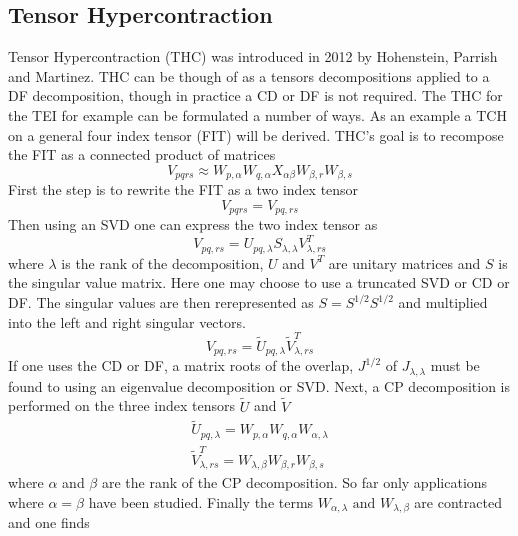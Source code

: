 	\subsection{Tensor Hypercontraction}
		Tensor Hypercontraction (THC) was introduced in 2012 by Hohenstein, Parrish and Martinez\cite{Schutski2017}. THC can be though of as a tensors decompositions applied to a DF decomposition, though in practice a CD or DF is not required. The THC for the TEI for example can be formulated a number of ways. As an example a TCH on a general four index tensor (FIT) will be derived. THC's goal is to recompose the FIT as a connected product of matrices 
			\begin{equation}
				V_{pqrs} \approx W_{p,\alpha} W_{q,\alpha} X_{\alpha\beta} W_{\beta, r} W_{\beta,s}
			\end{equation}
		First the step is to rewrite the FIT as a two index tensor
			\begin{equation}
				V_{pqrs} = V_{pq,rs}
			\end{equation}
		Then using an SVD one can express the two index tensor as
			\begin{equation}
				V_{pq,rs} = U_{pq,\lambda}S_{\lambda,\lambda} V^T_{\lambda, rs}
			\end{equation}
		where $\lambda$ is the rank of the decomposition, $U$ and $V^T$ are unitary matrices and $S$ is the singular value matrix. Here one may choose to use a truncated SVD or CD or DF. The singular values are then rerepresented as $S = S^{1/2} S^{1/2}$ and multiplied into the left and right singular vectors.
			\begin{equation}
				V_{pq,rs} = \tilde{U}_{pq, \lambda} \tilde{V}^T_{\lambda,rs}
			\end{equation}
		If one uses the CD or DF, a matrix roots of the overlap, $J^{1/2}$ of $J_{\lambda,\lambda}$ must be found to using an eigenvalue decomposition or SVD. Next, a CP decomposition is performed on the three index tensors $\tilde{U}$ and $\tilde{V}$
			\begin{equation}
				\begin{aligned}
					\tilde{U}_{pq, \lambda} = W_{p,\alpha} W_{q, \alpha} W_{\alpha, \lambda}\\
					\tilde{V}^T_{\lambda,rs} = W_{\lambda, \beta} W_{\beta, r} W_{\beta, s}
				\end{aligned}
			\end{equation}
		where $\alpha$ and $\beta$ are the rank of the CP decomposition. So far only applications where $\alpha = \beta$ have been studied. Finally the terms $W_{\alpha, \lambda} \text{ and } W_{\lambda, \beta}$ are contracted and one finds
